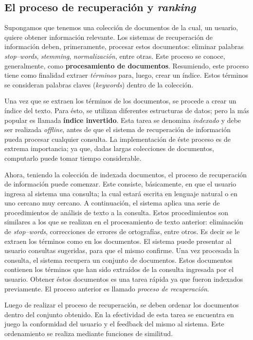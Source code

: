 	\subsection{El proceso de recuperación y \textit{ranking}}
		Supongamos que tenemos una colección de documentos de la cual, un usuario, quiere obtener información relevante. Los sistemas de recuperación de información deben, primeramente, procesar estos documentos: eliminar palabras \textit{stop--words}, \textit{stemming}, \textit{normalización}, entre otras. Este proceso se conoce, generalmente, como \textbf{procesamiento de documentos}. Resumiendo, este proceso tiene como finalidad extraer \textit{términos} para, luego, crear un índice. Estos términos se consideran palabras claves (\textit{keywords}) dentro de la colección. \par

		Una vez que se extraen los términos de los documentos, se procede a crear un índice del texto. Para ésto, se utilizan diferentes estructuras de datos; pero la más popular es llamada \textbf{índice invertido}. Esta tarea se denomina \textit{indexado} y debe ser realizada \textit{offline}, antes de que el sistema de recuperación de información pueda procesar cualquier consulta. La implementación de éste proceso es de extrema importancia; ya que, dadas largas colecciones de documentos, computarlo puede tomar tiempo considerable. \par

		Ahora, teniendo la colección de indexada documentos, el proceso de recuperación de información puede comenzar. Este consiste, básicamente, en que el usuario ingresa al sistema una consulta; la cual estará escrita en lenguaje natural o en uno cercano muy cercano. A continuación, el sistema aplica una serie de procedimientos de análisis de texto a la consulta. Estos procedimientos son similares a los que se realizan en el procesamiento de texto anterior: eliminación de \textit{stop--words}, correcciones de errores de ortografías, entre otros. Es decir se le extraen los términos como en los documentos. El sistema puede presentar al usuario consultas sugeridas, para que el mismo confirme. Una vez procesada la consulta, el sistema recupera un conjunto de documentos. Estos documentos contienen los términos que han sido extraídos de la consulta ingresada por el usuario. Obtener éstos documentos es una tarea rápida ya que fueron indexados previamente. El proceso anterior es llamado \textit{proceso de recuperación}. \par

		Luego de realizar el proceso de recuperación, se deben ordenar los documentos dentro del conjunto obtenido. En la efectividad de esta tarea se encuentra en juego la conformidad del usuario y el feedback del mismo al sistema. Este ordenamiento se realiza mediante funciones de similitud.
